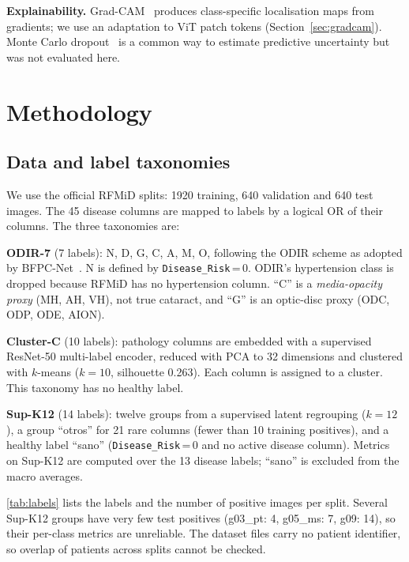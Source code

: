 ﻿\documentclass[conference]{IEEEtran}
\begin{document}
\textbf{Explainability.}
Grad-CAM~\cite{selvaraju2017gradcam} produces class-specific localisation maps from gradients; we use an adaptation to ViT patch tokens (Section~\ref{sec:gradcam}).
Monte Carlo dropout~\cite{gal2016dropout} is a common way to estimate predictive uncertainty but was not evaluated here.

\section{Methodology}
\subsection{Data and label taxonomies}
We use the official RFMiD splits: 1920 training, 640 validation and 640 test images.
The 45 disease columns are mapped to labels by a logical OR of their columns. The three taxonomies are:

\textbf{ODIR-7} (7 labels): N, D, G, C, A, M, O, following the ODIR scheme as adopted by BFPC-Net~\cite{li2022bfpc}. N is defined by \texttt{Disease\_Risk}\,=\,0. ODIR's hypertension class is dropped because RFMiD has no hypertension column. ``C'' is a \emph{media-opacity proxy} (MH, AH, VH), not true cataract, and ``G'' is an optic-disc proxy (ODC, ODP, ODE, AION).

\textbf{Cluster-C} (10 labels): pathology columns are embedded with a supervised ResNet-50 multi-label encoder, reduced with PCA to 32 dimensions and clustered with $k$-means ($k=10$, silhouette 0.263). Each column is assigned to a cluster. This taxonomy has no healthy label.

\textbf{Sup-K12} (14 labels): twelve groups from a supervised latent regrouping ($k=12$), a group ``otros'' for 21 rare columns (fewer than 10 training positives), and a healthy label ``sano'' (\texttt{Disease\_Risk}\,=\,0 and no active disease column). Metrics on Sup-K12 are computed over the 13 disease labels; ``sano'' is excluded from the macro averages.

\autoref{tab:labels} lists the labels and the number of positive images per split.
Several Sup-K12 groups have very few test positives (g03\_pt: 4, g05\_ms: 7, g09: 14), so their per-class metrics are unreliable.
The dataset files carry no patient identifier, so overlap of patients across splits cannot be checked.
\end{document}
